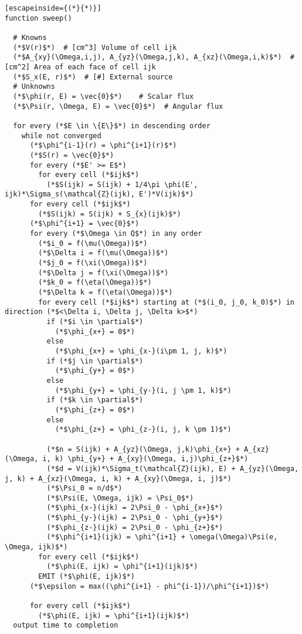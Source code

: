 \documentclass{article}
\numberwithin{equation}{subsection}
\begin{document}
\pagebreak
\begin{lstlisting}[escapeinside={(*}{*)}]
function sweep()

  # Knowns
  (*$V(r)$*)  # [cm^3] Volume of cell ijk
  (*$A_{xy}(\Omega,i,j), A_{yz}(\Omega,j,k), A_{xz}(\Omega,i,k)$*)  # [cm^2] Area of each face of cell ijk
  (*$S_x(E, r)$*)  # [#] External source
  # Unknowns
  (*$\phi(r, E) = \vec{0}$*)    # Scalar flux
  (*$\Psi(r, \Omega, E) = \vec{0}$*)  # Angular flux
  
  for every (*$E \in \{E\}$*) in descending order
    while not converged
      (*$\phi^{i-1}(r) = \phi^{i+1}(r)$*)
      (*$S(r) = \vec{0}$*)
      for every (*$E' >= E$*)
        for every cell (*$ijk$*)
          (*$S(ijk) = S(ijk) + 1/4\pi \phi(E', ijk)*\Sigma_s(\mathcal{Z}(ijk), E')*V(ijk)$*)
      for every cell (*$ijk$*)
        (*$S(ijk) = S(ijk) + S_{x}(ijk)$*)
      (*$\phi^{i+1} = \vec{0}$*)
      for every (*$\Omega \in Q$*) in any order
        (*$i_0 = f(\mu(\Omega))$*)
        (*$\Delta i = f(\mu(\Omega))$*)
        (*$j_0 = f(\xi(\Omega))$*)
        (*$\Delta j = f(\xi(\Omega))$*)
        (*$k_0 = f(\eta(\Omega))$*)
        (*$\Delta k = f(\eta(\Omega))$*)
        for every cell (*$ijk$*) starting at (*$(i_0, j_0, k_0)$*) in direction (*$<\Delta i, \Delta j, \Delta k>$*)
          if (*$i \in \partial$*)
            (*$\phi_{x+} = 0$*)
          else
            (*$\phi_{x+} = \phi_{x-}(i\pm 1, j, k)$*)    
          if (*$j \in \partial$*)
            (*$\phi_{y+} = 0$*)
          else
            (*$\phi_{y+} = \phi_{y-}(i, j \pm 1, k)$*) 
          if (*$k \in \partial$*)
            (*$\phi_{z+} = 0$*)
          else
            (*$\phi_{z+} = \phi_{z-}(i, j, k \pm 1)$*)     
          
          (*$n = S(ijk) + A_{yz}(\Omega, j,k)\phi_{x+} + A_{xz}(\Omega, i, k) \phi_{y+} + A_{xy}(\Omega, i,j)\phi_{z+}$*)
          (*$d = V(ijk)*\Sigma_t(\mathcal{Z}(ijk), E) + A_{yz}(\Omega, j, k) + A_{xz}(\Omega, i, k) + A_{xy}(\Omega, i, j)$*)
          (*$\Psi_0 = n/d$*)
          (*$\Psi(E, \Omega, ijk) = \Psi_0$*)
          (*$\phi_{x-}(ijk) = 2\Psi_0 - \phi_{x+}$*)
          (*$\phi_{y-}(ijk) = 2\Psi_0 - \phi_{y+}$*)
          (*$\phi_{z-}(ijk) = 2\Psi_0 - \phi_{z+}$*)
          (*$\phi^{i+1}(ijk) = \phi^{i+1} + \omega(\Omega)\Psi(e, \Omega, ijk)$*)
        for every cell (*$ijk$*)
          (*$\phi(E, ijk) = \phi^{i+1}(ijk)$*)
        EMIT (*$\phi(E, ijk)$*)
      (*$\epsilon = max((\phi^{i+1} - phi^{i-1})/\phi^{i+1})$*)
      
      for every cell (*$ijk$*)
        (*$\phi(E, ijk) = \phi^{i+1}(ijk)$*)
  output time to completion
\end{lstlisting}
\end{document}
